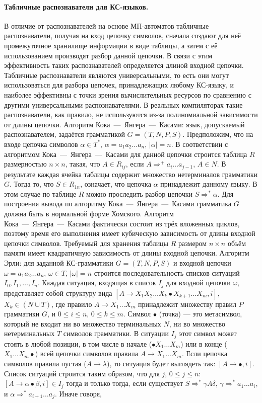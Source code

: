\documentclass[a4paper,12pt]{article}
\begin{document}
\paragraph{Табличные распознаватели для КС-языков.}
В отличие от распознавателей на основе МП-автоматов табличные распознаватели, получая на вход цепочку символов, сначала создают для неё промежуточное хранилище информации в виде таблицы, а затем с её использованием производят разбор данной цепочки. В связи с этим эффективность таких распознавателей определяется длиной входной цепочки. Табличные распознаватели являются универсальными, то есть они могут использоваться для разбора цепочек, принадлежащих любому КС-языку, и наиболее эффективны с точки зрения вычислительных ресурсов по сравнению с другими универсальными распознавателями. В реальных компиляторах такие распознаватели, как правило, не используются из-за полиномиальной зависимости от длины цепочки. Алгоритм Кока~—~Янгера~—~Касами: язык, допускаемый распознавателем, задаётся грамматикой \(G=(T,N,P,S)\). Предположим, что на входе цепочка символов \(\alpha\in T^*\), \(\alpha=a_1a_2\ldots a_n\), \(|\alpha|=n\). В соответствии с алгоритмом Кока~—~Янгера~—~Касами для данной цепочки строится таблица \(R\) размерностью \(n\times n\), такая, что \(A\in R_{ij}\), если \(A\Rightarrow^+a_i\ldots a_{j-1}\), \(A\in N\). В результате каждая ячейка таблицы содержит множество нетерминалов грамматики \(G\). Тогда то, что \(S\in R_{1n}\), означает, что цепочка \(\alpha\) принадлежит данному языку. В этом случае по таблице \(R\) можно проследить разбор цепочки \(S\Rightarrow^*\alpha\). Для построения вывода по алгоритму Кока~—~Янгера~—~Касами грамматика \(G\) должна быть в нормальной форме Хомского. Алгоритм Кока~—~Янгера~—~Касами фактически состоит из трёх вложенных циклов, поэтому время его выполнения имеет кубическую зависимость от длины входной цепочки символов. Требуемый для хранения таблицы \(R\) размером \(n\times n\) объём памяти имеет квадратичную зависимость от длины входной цепочки. Алгоритм Эрли: для заданной КС-грамматики \(G=(T,N,P,S)\) и входной цепочки \(\omega=a_1a_2\ldots a_n\), \(\omega\in T\), \(|\omega|=n\) строится последовательность списков ситуаций \(I_0,I_1,\ldots,I_n\). Каждая ситуация, входящая в список \(I_j\) для входной цепочки \(\omega\), представляет собой структуру вида \([A\to X_1X_2\ldots X_k\bullet X_{k+1}\ldots X_m,i]\), \(X_k\in(N\cup T)\), где правило \(A\to X_1\ldots X_m\) принадлежит множеству правил \(P\) грамматики \(G\), и \(0\le i\le n\), \(0\le k\le m\). Символ \(\bullet\) (точка) — это метасимвол, который не входит ни во множество терминальных \(N\), ни во множество нетерминальных \(T\) символов грамматики. В ситуации \(I_j\) этот символ может стоять в любой позиции, в том числе в начале (\(\bullet X_1\ldots X_m\)) или в конце (\(X_1\ldots X_m\bullet\)) всей цепочки символов правила \(A\to X_1\ldots X_m\). Если цепочка символов правила пустая (\(A\to\lambda\)), то ситуация будет выглядеть так: \([A\to\bullet,i]\). Список ситуаций строится таким образом, что для \(j\), \(0\le j\le n\): \([A\to\alpha\bullet\beta,i]\in I_j\) тогда и только тогда, если существует \(S\Rightarrow^*\gamma A\delta\), \(\gamma\Rightarrow^*a_1\ldots a_i\), и \(\alpha\Rightarrow^*a_{i+1}\ldots a_j\). Иначе говоря, 
\end{document}
